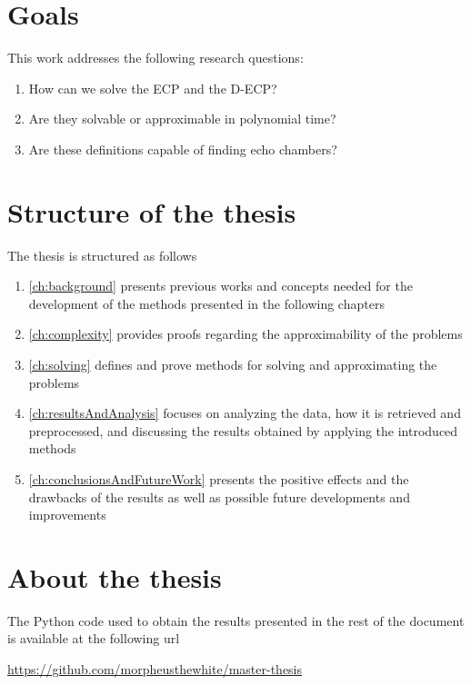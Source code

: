 \section{Goals}
\label{sec:goals}

This work addresses the following research questions:

\begin{enumerate}
	\item How can we solve the \acrlong{ECP} and the \acrlong{D-ECP}?
	\item Are they solvable or approximable in polynomial time?
	\item Are these definitions capable of finding echo chambers?
\end{enumerate}

\section{Structure of the thesis}
\label{sec:structure-thesis}

The thesis is structured as follows

\begin{enumerate}
	\item \autoref{ch:background} presents previous works and concepts
	      needed for the development of the methods presented in
	      the following chapters
	\item \autoref{ch:complexity} provides proofs regarding the approximability
	      of the problems
	\item \autoref{ch:solving} defines and prove methods for solving
	      and approximating the problems
	\item \autoref{ch:resultsAndAnalysis} focuses on analyzing the
	      data, how it is retrieved and preprocessed, and discussing the results
	      obtained by applying the introduced methods
	\item \autoref{ch:conclusionsAndFutureWork} presents the positive effects
	      and the drawbacks of the results as well as possible future
	      developments and improvements
\end{enumerate}

\section{About the thesis}
\label{sec:about-thesis}

The Python code used to obtain the results presented in the rest of the
document is available at the following url

\begin{center}
	\url{https://github.com/morpheusthewhite/master-thesis}
\end{center}
